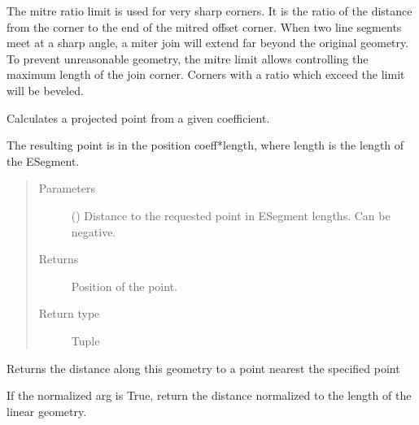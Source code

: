 \documentclass[letterpaper,10pt,english]{sphinxmanual}
\begin{document}
\begin{fulllineitems}
\begin{fulllineitems}
The mitre ratio limit is used for very sharp corners. It is the ratio
of the distance from the corner to the end of the mitred offset corner.
When two line segments meet at a sharp angle, a miter join will extend
far beyond the original geometry. To prevent unreasonable geometry, the
mitre limit allows controlling the maximum length of the join corner.
Corners with a ratio which exceed the limit will be beveled.

\end{fulllineitems}


\begin{fulllineitems}
\label{\detokenize{reference:taipanPyRouter.ESegment.pointFromCoeff}}
Calculates a projected point from a given coefficient.

The resulting point is in the position coeff*length, where length is
the length of the ESegment.
\begin{quote}\begin{description}
\item[{Parameters}] \leavevmode
{} () \textendash{} Distance to the requested point in ESegment lengths. Can be negative.

\item[{Returns}] \leavevmode
Position of the point.

\item[{Return type}] \leavevmode
Tuple

\end{description}\end{quote}

\end{fulllineitems}


\begin{fulllineitems}
\label{\detokenize{reference:taipanPyRouter.ESegment.project}}
Returns the distance along this geometry to a point nearest the
specified point

If the normalized arg is True, return the distance normalized to the
length of the linear geometry.

\end{fulllineitems}


\end{fulllineitems}
\end{document}
